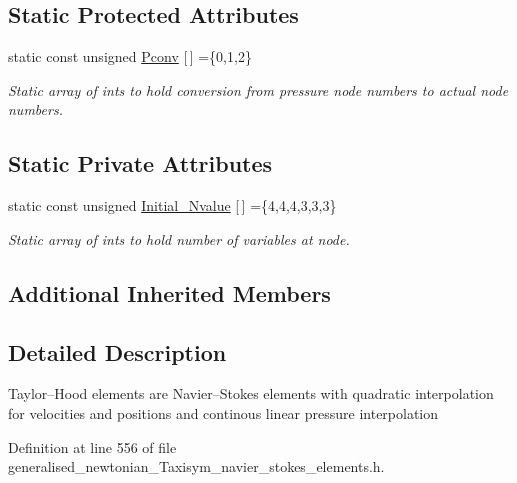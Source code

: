 \subsection*{Static Protected Attributes}
\begin{DoxyCompactItemize}
\item 
static const unsigned \hyperlink{classoomph_1_1GeneralisedNewtonianAxisymmetricTTaylorHoodElement_acd1d91d33a8a6b6a4f7ffee878512732}{Pconv} \mbox{[}$\,$\mbox{]} =\{0,1,2\}
\begin{DoxyCompactList}\small\item\em Static array of ints to hold conversion from pressure node numbers to actual node numbers. \end{DoxyCompactList}\end{DoxyCompactItemize}
\subsection*{Static Private Attributes}
\begin{DoxyCompactItemize}
\item 
static const unsigned \hyperlink{classoomph_1_1GeneralisedNewtonianAxisymmetricTTaylorHoodElement_a23c42ed8e8f9cd1f33b906c854294223}{Initial\+\_\+\+Nvalue} \mbox{[}$\,$\mbox{]} =\{4,4,4,3,3,3\}
\begin{DoxyCompactList}\small\item\em Static array of ints to hold number of variables at node. \end{DoxyCompactList}\end{DoxyCompactItemize}
\subsection*{Additional Inherited Members}


\subsection{Detailed Description}
Taylor--Hood elements are Navier--Stokes elements with quadratic interpolation for velocities and positions and continous linear pressure interpolation 

Definition at line 556 of file generalised\+\_\+newtonian\+\_\+\+Taxisym\+\_\+navier\+\_\+stokes\+\_\+elements.\+h.



